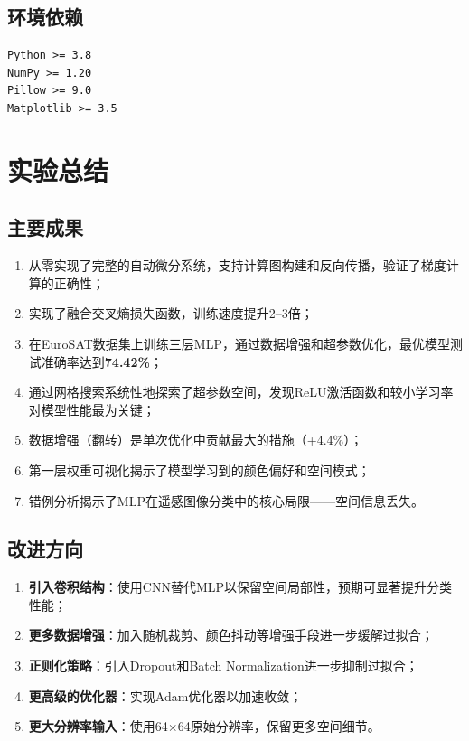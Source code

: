 \documentclass[12pt,a4paper]{article}
\begin{document}
\subsection{环境依赖}

\begin{lstlisting}[caption=环境依赖]
Python >= 3.8
NumPy >= 1.20
Pillow >= 9.0
Matplotlib >= 3.5
\end{lstlisting}

\section{实验总结}

\subsection{主要成果}

\begin{enumerate}[leftmargin=2em]
    \item 从零实现了完整的自动微分系统，支持计算图构建和反向传播，验证了梯度计算的正确性；
    \item 实现了融合交叉熵损失函数，训练速度提升2--3倍；
    \item 在EuroSAT数据集上训练三层MLP，通过数据增强和超参数优化，最优模型测试准确率达到\textbf{74.42\%}；
    \item 通过网格搜索系统性地探索了超参数空间，发现ReLU激活函数和较小学习率对模型性能最为关键；
    \item 数据增强（翻转）是单次优化中贡献最大的措施（+4.4\%）；
    \item 第一层权重可视化揭示了模型学习到的颜色偏好和空间模式；
    \item 错例分析揭示了MLP在遥感图像分类中的核心局限——空间信息丢失。
\end{enumerate}

\subsection{改进方向}

\begin{enumerate}[leftmargin=2em]
    \item \textbf{引入卷积结构}：使用CNN替代MLP以保留空间局部性，预期可显著提升分类性能；
    \item \textbf{更多数据增强}：加入随机裁剪、颜色抖动等增强手段进一步缓解过拟合；
    \item \textbf{正则化策略}：引入Dropout和Batch Normalization进一步抑制过拟合；
    \item \textbf{更高级的优化器}：实现Adam优化器以加速收敛；
    \item \textbf{更大分辨率输入}：使用64$\times$64原始分辨率，保留更多空间细节。
\end{enumerate}
\end{document}
